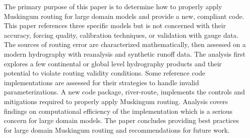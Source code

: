 The primary purpose of this paper is to determine how to properly apply Muskingum routing for large domain models and provide a new, compliant code.
This paper references three specific models but is not concerned with their accuracy, forcing quality, calibration techniques, or validation with gauge data.
The sources of routing error are characterized mathematically, then assessed on a modern hydrography with reanalysis and synthetic runoff data.
The analysis first explores a few continental or global level hydrography products and their potential to violate routing validity conditions.
Some reference code implementations are assessed for their strategies to handle invalid parameterizations.
A new code package, river-route, implements the controls and mitigations required to properly apply Muskingum routing.
Analysis covers findings on computational efficiency of the implementation which is a serious concern for large domain models.
The paper concludes providing best practices for large domain Muskingum routing and recommendations for future work.
